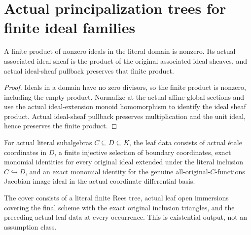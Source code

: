 \section{Actual principalization trees for finite ideal families}

\begin{lemma}\label{lem:sc0-nonzero-family-product-sheaf}
\leanok
A finite product of nonzero ideals in the literal domain is nonzero. Its
actual associated ideal sheaf is the product of the original associated
ideal sheaves, and actual ideal-sheaf pullback preserves that finite product.
\end{lemma}
\begin{proof}
Ideals in a domain have no zero divisors, so the finite product is nonzero,
including the empty product. Normalize at the actual affine global sections
and use the actual ideal-extension monoid homomorphism to identify the ideal
sheaf product. Actual ideal-sheaf pullback preserves multiplication and the
unit ideal, hence preserves the finite product.
\end{proof}

\begin{definition}\label{def:sc0-etale-family-monomial-leaf}
\leanok
For actual literal subalgebras $C\subseteq D\subseteq K$, the leaf data
consists of actual \'etale coordinates in $D$, a finite injective selection
of boundary coordinates, exact monomial identities for every original ideal
extended under the literal inclusion $C\hookrightarrow D$, and an exact
monomial identity for the genuine all-original-$C$-functions Jacobian image
ideal in the actual coordinate differential basis.
\end{definition}

\begin{definition}\label{def:sc0-family-monomial-rees-cover}
\leanok
{}
The cover consists of a literal finite Rees tree, actual leaf open immersions
covering the final scheme with the exact original inclusion triangles, and
the preceding actual leaf data at every occurrence. This is existential
output, not an assumption class.
\end{definition}

